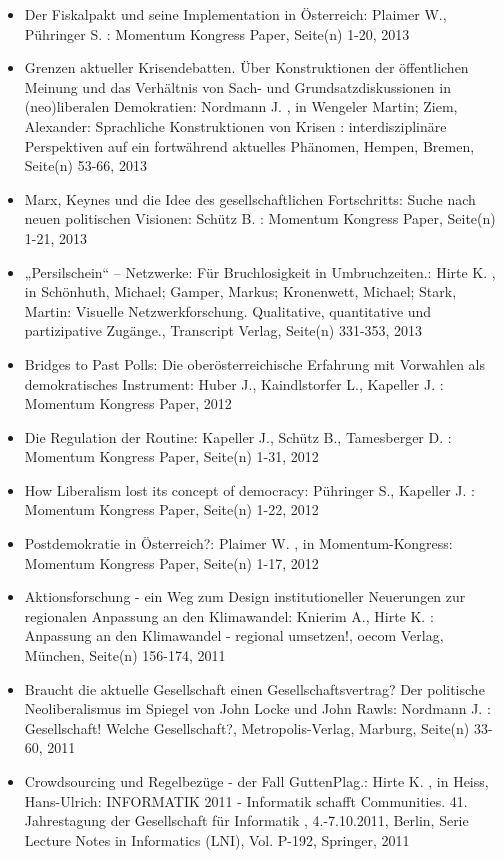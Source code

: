 \begin{itemize}
\item Der Fiskalpakt und seine Implementation in Österreich: Plaimer W., Pühringer S. : Momentum Kongress Paper, Seite(n) 1-20, 2013
\item Grenzen aktueller Krisendebatten. Über Konstruktionen der öffentlichen Meinung und das Verhältnis von Sach- und Grundsatzdiskussionen in (neo)liberalen Demokratien: Nordmann J. , in Wengeler Martin; Ziem, Alexander: Sprachliche Konstruktionen von Krisen : interdisziplinäre Perspektiven auf ein fortwährend aktuelles Phänomen, Hempen, Bremen, Seite(n) 53-66, 2013
\item Marx, Keynes und die Idee des gesellschaftlichen Fortschritts: Suche nach neuen politischen Visionen: Schütz B. : Momentum Kongress Paper, Seite(n) 1-21, 2013
\item „Persilschein“ – Netzwerke: Für Bruchlosigkeit in Umbruchzeiten.: Hirte K. , in Schönhuth, Michael; Gamper, Markus; Kronenwett, Michael; Stark, Martin: Visuelle Netzwerkforschung. Qualitative, quantitative und partizipative Zugänge., Transcript Verlag, Seite(n) 331-353, 2013
\item Bridges to Past Polls: Die oberösterreichische Erfahrung mit Vorwahlen als demokratisches Instrument: Huber J., Kaindlstorfer L., Kapeller J. : Momentum Kongress Paper, 2012
\item Die Regulation der Routine: Kapeller J., Schütz B., Tamesberger D. : Momentum Kongress Paper, Seite(n) 1-31, 2012
\item How Liberalism lost its concept of democracy: Pühringer S., Kapeller J. : Momentum Kongress Paper, Seite(n) 1-22, 2012
\item Postdemokratie in Österreich?: Plaimer W. , in Momentum-Kongress: Momentum Kongress Paper, Seite(n) 1-17, 2012
\item Aktionsforschung - ein Weg zum Design institutioneller Neuerungen zur regionalen Anpassung an den Klimawandel: Knierim A., Hirte K. : Anpassung an den Klimawandel - regional umsetzen!, oecom Verlag, München, Seite(n) 156-174, 2011
\item Braucht die aktuelle Gesellschaft einen Gesellschaftsvertrag? Der politische Neoliberalismus im Spiegel von John Locke und John Rawls: Nordmann J. : Gesellschaft! Welche Gesellschaft?, Metropolis-Verlag, Marburg, Seite(n) 33-60, 2011
\item Crowdsourcing und Regelbezüge - der Fall GuttenPlag.: Hirte K. , in Heiss, Hans-Ulrich: INFORMATIK 2011 - Informatik schafft Communities. 41. Jahrestagung der Gesellschaft für Informatik , 4.-7.10.2011, Berlin, Serie Lecture Notes in Informatics (LNI), Vol. P-192, Springer, 2011

\end{itemize}
